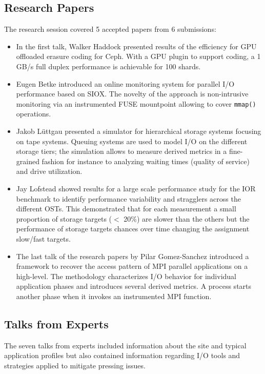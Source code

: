 \documentclass{llncs}
\begin{document}
\subsection{Research Papers}

The research session covered 5 accepted papers from 6 submissions:
\begin{itemize}
\item In the first talk, Walker Haddock presented results of the efficiency for GPU offloaded erasure coding for Ceph.
With a GPU plugin to support coding, a 1 GB/s full duplex performance is achievable for 100 shards.
\item Eugen Betke introduced an online monitoring system for parallel I/O performance based on SIOX.
The novelty of the approach is non-intrusive monitoring via an instrumented FUSE mountpoint allowing to cover \texttt{mmap()} operations.
\item Jakob Lüttgau presented a simulator for hierarchical storage systems focusing on tape systems.
Queuing systems are used to model I/O on the different storage tiers;
the simulation allows to measure derived metrics in a fine-grained fashion for instance to analyzing waiting times (quality of service) and drive utilization.
\item Jay Lofstead showed results for a large scale performance study for the IOR benchmark to identify performance variability and stragglers across the different OSTs.
This demonstrated that for each measurement a small proportion of storage targets ($<$ 20\%) are slower than the others but the performance of storage targets chances over time changing the assignment slow/fast targets.
\item The last talk of the research papers by Pilar Gomez-Sanchez introduced a framework to recover the access pattern of MPI parallel applications on a high-level.
The methodology characterizes I/O behavior for individual application phases and introduces several derived metrics.
A process starts another phase when it invokes an instrumented MPI function.
\end{itemize}

\subsection{Talks from Experts}

The seven talks from experts included information about the site and typical
application profiles but also contained information regarding I/O tools and strategies applied to mitigate pressing issues.
\end{document}
